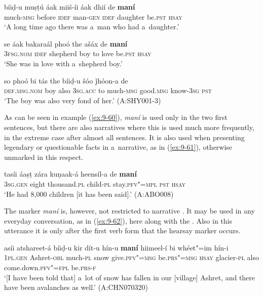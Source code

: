 \begin{exe}
\ex
\label{ex:9-60}
\gll \label{bkm:Ref190746425}bíiḍ-u muṣṭú áak miiš-íi áak dhií de \textbf{maní} \\
much-\textsc{msg} before \textsc{idef} man-\textsc{gen} \textsc{idef} daughter be.\textsc{pst}
\textsc{hsay} \\
\glt `A long time ago there was a~man who had a~daughter.' 

\gll se áak bakaraál phoó the ašáx de \textbf{maní} \\
\textsc{3fsg.nom} \textsc{idef} shepherd boy to love be.\textsc{pst} \textsc{hsay} \\
\glt `She was in love with a~shepherd boy.'

\gll so phoó bi tás the bíiḍ-u  šóo ǰhóon-a de \\
\textsc{def.msg.nom} boy also \textsc{3sg.acc} to much-\textsc{msg}  good.\textsc{msg} know-\textsc{3sg} \textsc{pst} \\
\glt `The boy was also very fond of her.' (A:SHY001-3)
\end{exe}

As can be seen in example (\ref{ex:9-60}), \textit{maní} is used only in the two first sentences, but there are also narratives where this is used much more frequently, in the extreme case after almost all sentences. It is also used when presenting legendary or questionable facts in a~narrative, as in (\ref{ex:9-61}), otherwise unmarked in this respect.

\begin{exe}
\ex
\label{ex:9-61}
\gll tasíi áaṣṭ zára kuṇaak-á heensíl-a de \textbf{maní} \\
3\textsc{sg.gen} eight thousand.\textsc{pl} child-\textsc{pl} stay.\textsc{pfv"=mpl} \textsc{pst} \textsc{hsay} \\
\glt `He had 8,000 children [it has been said].' (A:ABO008)
\end{exe}

The marker \textit{maní} is, however, not restricted to narrative . It may be used in any everyday conversation, as in (\ref{ex:9-62}), here along with the . Also in this utterance it is only after the first  verb form that the hearsay marker occurs.

\ea
\label{ex:9-62}
\gll asíi atshareet-á bíiḍ-u kir dít-u hín-u \textbf{maní} hiimeel-í bi whéet"=im hín-i\\
\textsc{1pl.gen} Ashret-\textsc{obl} much-\textsc{pl} snow give.\textsc{pfv"=msg} be.\textsc{prs"=msg} \textsc{hsay} glacier-\textsc{pl} also come.down.\textsc{pfv"=fpl} be.\textsc{prs-f}\\
\glt `[I have been told that] a~lot of snow has fallen in our [village] Ashret, and there have been avalanches as well.' (A:CHN070320)
\z

